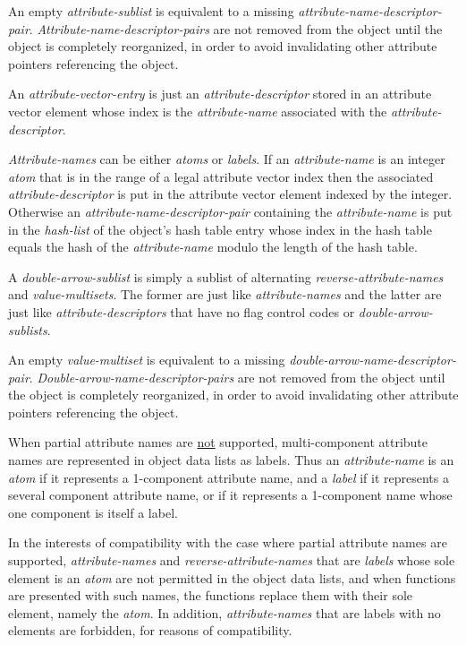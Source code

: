 \documentclass[12pt]{article}
\begin{document}
An empty {\em attribute-sublist} is equivalent to a missing
{\em attribute-name-descriptor-pair}.
{\em Attri\-bute-name-descriptor-pairs} are not
removed from the object until the object is completely reorganized,
in order to avoid invalidating other attribute pointers referencing the object.

An {\em attribute-vector-entry} is just an {\em attribute-descriptor}
stored in an attribute vector element whose index is the
{\em attribute-name} associated with the {\em attribute-descriptor}.

{\em Attribute-names} can be either {\em atoms} or {\em labels}.
If an {\em attribute-name} is an integer {\em atom}
that is in the range of a legal
attribute vector index then the associated
{\em attribute-descriptor} is put in the attribute vector element
indexed by the integer.
Otherwise an {\em attribute-name-descriptor-pair} containing
the {\em attribute-name} is put
in the {\em hash-list} of the object's hash table entry whose index
in the hash table
equals the hash of the {\em attribute-name} modulo the length of the
hash table.

A {\em double-arrow-sublist} is 
simply a sublist of alternating {\em reverse-attribute-names}
and {\em value-multisets}.  The former are just like {\em attribute-names}
and the latter are just like {\em attribute-descriptors} that have no
flag control codes or {\em double-arrow-sublists}.

An empty {\em value-multiset} is equivalent to a missing
{\em double-arrow-name-descriptor-pair}.
{\em Dou\-ble-arrow-name-descriptor-pairs} are not
removed from the object until the object is completely reorganized,
in order to avoid invalidating other attribute pointers referencing the object.

When partial attribute names are \underline{not} supported, multi-component
attribute names are represented in object data lists as labels.
Thus an {\em attribute-name} is an {\em atom} if it represents a 1-component
attribute name, and a {\em label} if it represents a several component
attribute name, or if it represents a 1-component name whose one component
is itself a label.

In the interests of compatibility with the case where partial attribute
names are supported, {\em attribute-names} and {\em reverse-attribute-names}
that are {\em labels} whose sole element is an {\em atom} are not
permitted in the object data lists, and when functions are presented with
such names, the functions replace them with their sole element, namely the
{\em atom}.  In addition, {\em attribute-names} that are labels with no elements
are forbidden, for reasons of compatibility.
\end{document}
